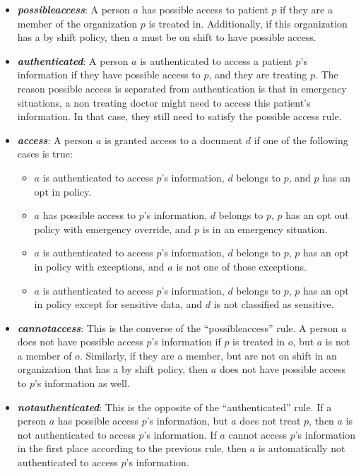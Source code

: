 \documentclass[conference]{IEEEtran}
\begin{document}
\begin{itemize}
 \item \textbf{\textit{possibleaccess}}: A person $a$ has possible access to patient $p$ if they are a member of the organization $p$ is treated in.
Additionally, if this organization has a by shift policy, then $a$ must be on shift to have possible access.
\item \textbf{\textit{authenticated}}: A person $a$ is authenticated to access a patient $p$'s information if they have possible access to $p$, and they are
treating $p$. The reason possible access is separated from authentication is that in emergency situations, a non treating doctor might need to access this
patient's information. In that case, they still need to satisfy the possible access rule.
\item \textbf{\textit{access}}: A person $a$ is granted access to a document $d$ if one of the following cases is true:
\begin{itemize}
 \item $a$ is authenticated to access $p$'s information, $d$ belongs to $p$, and $p$ has an opt in policy.
\item $a$ has possible access to $p$'s information, $d$ belongs to $p$, $p$ has an opt out policy with emergency override, and $p$ is in an emergency situation.
\item $a$ is authenticated to access $p$'s information, $d$ belongs to $p$, $p$ has an opt in policy with exceptions, and $a$ is not one of those exceptions.
\item $a$ is authenticated to access $p$'s information, $d$ belongs to $p$, $p$ has an opt in policy except for sensitive data, and $d$ is not classified as
sensitive.
\end{itemize}
\item \textbf{\textit{cannotaccess}}: This is the converse of the ``possibleaccess'' rule. A person $a$ does not have possible access $p$'s information if $p$
is treated in $o$, but $a$ is not a member of $o$. Similarly, if they are a member, but are not on shift in an organization that has a by shift policy, then $a$
does not have possible access to $p$'s information as well.
\item \textbf{\textit{notauthenticated}}: This is the opposite of the ``authenticated'' rule. If a person $a$ has possible access $p$'s information, but
$a$
does not treat $p$, then $a$ is not authenticated to access $p$'s information. If $a$ cannot access $p$'s information in the first place according to the
previous rule, then $a$ is automatically not authenticated to access $p$'s information.

\end{itemize}
\end{document}
